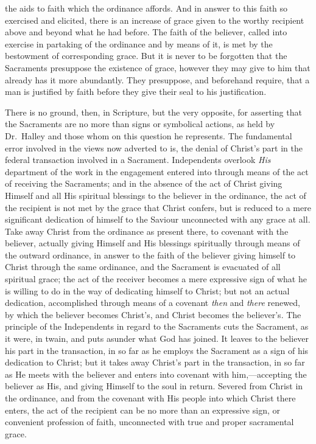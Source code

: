 \documentclass[english,]{book}
\begin{document}
the aids to faith which the ordinance affords. And in answer to this faith so exercised and elicited, there is an increase of grace given to the worthy recipient above and beyond what he had before. The faith of the believer, called into exercise in partaking of the ordinance and by means of it, is met by the bestowment of corresponding grace. But it is never to be forgotten that the Sacraments presuppose the existence of grace, however they may give to him that already has it more abundantly. They presuppose, and beforehand require, that a man is justified by faith before they give their seal to his justification.

There is no ground, then, in Scripture, but the very opposite, for asserting that the Sacraments are no more than signs or symbolical actions, as held by Dr.~Halley and those whom on this question he represents. The fundamental error involved in the views now adverted to is, the denial of Christ's part in the federal transaction involved in a Sacrament. Independents overlook \emph{His} department of the work in the engagement entered into through means of the act of receiving the Sacraments; and in the absence of the act of Christ giving Himself and all His spiritual blessings to the believer in the ordinance, the act of the recipient is not met by the grace that Christ confers, but is reduced to a mere significant dedication of himself to the Saviour unconnected with any grace at all. Take away Christ from the ordinance as present there, to covenant with the believer, actually giving Himself and His blessings spiritually through means of the outward ordinance, in answer to the faith of the believer giving himself to Christ through the same ordinance, and the Sacrament is evacuated of all spiritual grace; the act of the receiver becomes a mere expressive sign of what he is willing to do in the way of dedicating himself to Christ; but not an actual dedication, accomplished through means of a covenant \emph{then} and \emph{there} renewed, by which the believer becomes Christ's, and Christ becomes the believer's. The principle of the Independents in regard to the Sacraments cuts the Sacrament, as it were, in twain, and puts asunder what God has joined. It leaves to the believer his part in the transaction, in so far as he employs the Sacrament as a sign of his dedication to Christ; but it takes away Christ's part in the transaction, in so far as He meets with the believer and enters into covenant with him,---accepting the believer as His, and giving Himself to the soul in return. Severed from Christ in the ordinance, and from the covenant with His people into which Christ there enters, the act of the recipient can be no more than an expressive sign, or convenient profession of faith, unconnected with true and proper sacramental grace.
\end{document}
